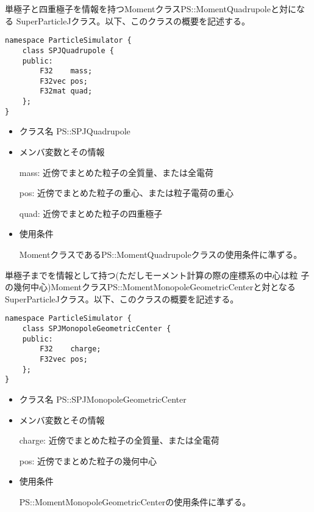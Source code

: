 
単極子と四重極子を情報を持つMomentクラスPS::MomentQuadrupoleと対になる
SuperParticleJクラス。以下、このクラスの概要を記述する。
\begin{screen}
\begin{verbatim}
namespace ParticleSimulator {
    class SPJQuadrupole {
    public:
        F32    mass;
        F32vec pos;
        F32mat quad;
    };
}
\end{verbatim}
\end{screen}

\begin{itemize}
\item クラス名
  PS::SPJQuadrupole

\item メンバ変数とその情報

  mass: 近傍でまとめた粒子の全質量、または全電荷

  pos: 近傍でまとめた粒子の重心、または粒子電荷の重心

  quad: 近傍でまとめた粒子の四重極子

\item 使用条件

  MomentクラスであるPS::MomentQuadrupoleクラスの使用条件に準ずる。

\end{itemize}


単極子までを情報として持つ(ただしモーメント計算の際の座標系の中心は粒
子の幾何中心)MomentクラスPS::MomentMonopoleGeometricCenterと対となる
SuperParticleJクラス。以下、このクラスの概要を記述する。
\begin{screen}
\begin{verbatim}
namespace ParticleSimulator {
    class SPJMonopoleGeometricCenter {
    public:
        F32    charge;    
        F32vec pos;
    };
}
\end{verbatim}
\end{screen}

\begin{itemize}
\item クラス名
  PS::SPJMonopoleGeometricCenter

\item メンバ変数とその情報

  charge: 近傍でまとめた粒子の全質量、または全電荷

  pos: 近傍でまとめた粒子の幾何中心

\item 使用条件

  PS::MomentMonopoleGeometricCenterの使用条件に準ずる。

\end{itemize}

